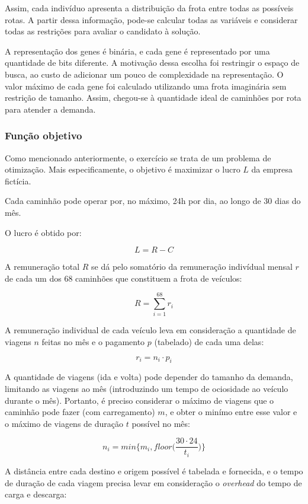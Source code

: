 \documentclass[11pt]{article}
\begin{document}
Assim, cada indivíduo apresenta a distribuição da frota entre todas as
possíveis rotas. A partir dessa informação, pode-se calcular todas as
variáveis e considerar todas as restrições para avaliar o candidato à
solução.

A representação dos genes é binária, e cada gene é representado por uma
quantidade de bits diferente. A motivação dessa escolha foi restringir o
espaço de busca, ao custo de adicionar um pouco de complexidade na
representação. O valor máximo de cada gene foi calculado utilizando uma
frota imaginária sem restrição de tamanho. Assim, chegou-se à quantidade
ideal de caminhões por rota para atender a demanda.

    \hypertarget{funuxe7uxe3o-objetivo}{%
\subsubsection{Função objetivo}\label{funuxe7uxe3o-objetivo}}

Como mencionado anteriormente, o exercício se trata de um problema de
otimização. Mais especificamente, o objetivo é maximizar o lucro \(L\)
da empresa fictícia.

Cada caminhão pode operar por, no máximo, 24h por dia, ao longo de 30
dias do mês.

O lucro é obtido por:

\[L = R - C\]

A remuneração total \(R\) se dá pelo somatório da remuneração indivídual
mensal \(r\) de cada um dos 68 caminhões que constituem a frota de
veículos:

\[R = \sum_{i=1}^{68} r_i\]

A remuneração individual de cada veículo leva em consideração a
quantidade de viagens \(n\) feitas no mês e o pagamento \(p\) (tabelado)
de cada uma delas:

\[r_i = n_i \cdot p_i\]

A quantidade de viagens (ida e volta) pode depender do tamanho da
demanda, limitando as viagens ao mês (introduzindo um tempo de
ociosidade ao veículo durante o mês). Portanto, é preciso considerar o
máximo de viagens que o caminhão pode fazer (com carregamento) \(m\), e
obter o minímo entre esse valor e o máximo de viagens de duração \(t\)
possível no mês:

\[n_i = min\bigg\{m_i, floor\bigg(\frac{30 \cdot 24}{t_i}\bigg)\bigg\}\]

A distância entre cada destino e origem possível é tabelada e fornecida,
e o tempo de duração de cada viagem precisa levar em consideração o
\emph{overhead} do tempo de carga e descarga:
\end{document}
